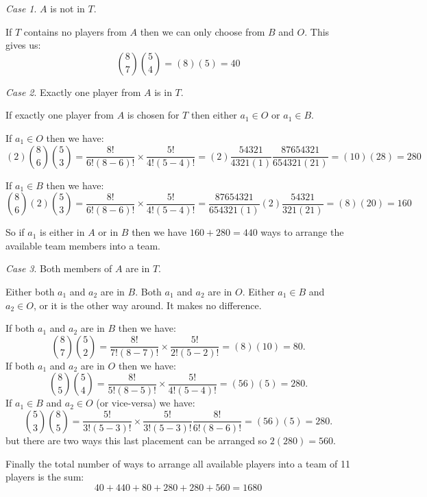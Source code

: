 \documentclass[10pt,a4paper,titlepage,twoside,draft]{article}
\theoremstyle{plain}
\theoremstyle{definition}
\theoremstyle{remark}
\newtheorem{case}{Case}
\begin{document}
\medskip

\begin{case}
${A}$ is not in ${T}$.

If ${T}$ contains no players from ${A}$ then we can only choose from ${B}$ and ${O}$. 
This gives us: 
\[\binom{8}{7} \binom{5}{4} = (8)(5) = 40\]
\end{case}

\medskip

\begin{case}
Exactly one player from ${A}$ is in ${T}$.
	
If exactly one player from ${A}$ is chosen for ${T}$ then either $a_{1} \in {O}$ or $a_{1} \in {B}$. 

 If $a_{1} \in {O}$ then we have: 
\[ (2) \binom{8}{6} \binom{5}{3} = \frac{8!}{6!(8-6)!} \times \frac{5!}{4!(5-4)!} = (2) \frac{54321}{4321(1)} \frac{87654321}{654321(21)} = (10)(28) = 280 \]

 If $a_{1} \in {B}$ then we have: 
\[ \binom{8}{6} (2) \binom{5}{3} = \frac{8!}{6!(8-6)!} \times \frac{5!}{4!(5-4)!} = \frac{87654321}{654321(1)} (2) \frac{54321}{321(21)} = (8)(20) = 160 \]


So if $a_{1}$ is either in ${A}$ or in ${B}$ then we have $160+280 = 440$ ways to arrange the available team members into a team. 
\end{case}

\medskip

\begin{case}
Both members of ${A}$ are in ${T}$.


Either both $a_{1}$ and $a_{2}$ are in ${B}$.
Both $a_{1}$ and $a_{2}$ are in ${O}$.
Either $a_{1} \in {B}$ and $a_{2} \in {O}$, or it is the other way around. It makes no difference. 

If both $a_{1}$ and $a_{2}$ are in ${B}$ then we have: 
\[ \binom{8}{7} \binom{5}{2} = \frac{8!}{7!(8-7)!} \times \frac{5!}{2!(5-2)!} = (8)(10) = 80. \]
If both  $a_{1}$ and $a_{2}$ are in ${O}$ then we have: 
\[ \binom{8}{5} \binom{5}{4} = \frac{8!}{5!(8-5)!} \times \frac{5!}{4!(5-4)!} = (56)(5) = 280. \]
If $a_{1} \in {B}$ and $a_{2} \in {O}$ (or vice-versa) we have: 
\[ \binom{5}{3} \binom{8}{5} = \frac{5!}{3!(5-3)!} \times \frac{5!}{3!(5-3)!} \frac{8!}{6!(8-6)!} = (56)(5) = 280. \]
but there are two ways this last placement can be arranged so $2(280) = 560$. 
\end{case}

\medskip

Finally the total number of ways to arrange all available players into a team of 11 players is the sum: 
\[ 40 + 440 + 80 + 280 + 280 + 560 = 1680 \]
\end{document}
